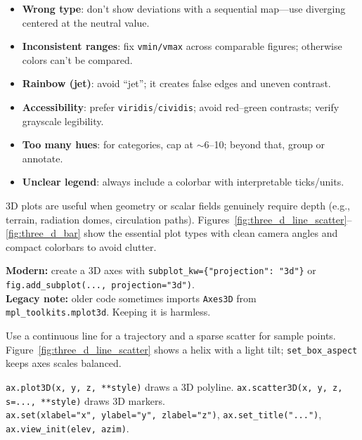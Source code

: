 
\begin{itemize}
    \item \textbf{Wrong type}: don’t show deviations with a sequential map—use diverging centered at the neutral value.
    \item \textbf{Inconsistent ranges}: fix \texttt{vmin/vmax} across comparable figures; otherwise colors can’t be compared.
    \item \textbf{Rainbow (jet)}: avoid “jet”; it creates false edges and uneven contrast.
    \item \textbf{Accessibility}: prefer \texttt{viridis}/\texttt{cividis}; avoid red--green contrasts; verify grayscale legibility.
    \item \textbf{Too many hues}: for categories, cap at $\sim$6–10; beyond that, group or annotate.
    \item \textbf{Unclear legend}: always include a colorbar with interpretable ticks/units.
\end{itemize}



3D plots are useful when geometry or scalar fields genuinely require depth (e.g., terrain, radiation domes, circulation paths). Figures~\ref{fig:three_d_line_scatter}–\ref{fig:three_d_bar} show the essential plot types with clean camera angles and compact colorbars to avoid clutter.

\begin{tcolorbox}[title=Getting a 3D axes (modern and legacy), colframe=blue, colback=white, arc=2mm, breakable]
\textbf{Modern:} create a 3D axes with \verb|subplot_kw={"projection": "3d"}| or \verb|fig.add_subplot(..., projection="3d")|.\\
\textbf{Legacy note:} older code sometimes imports \verb|Axes3D| from \verb|mpl_toolkits.mplot3d|. Keeping it is harmless.
\end{tcolorbox}


Use a continuous line for a trajectory and a sparse scatter for sample points. Figure~\ref{fig:three_d_line_scatter} shows a helix with a light tilt; \verb|set_box_aspect| keeps axes scales balanced.

\begin{tcolorbox}[title=Key syntax, colframe=blue, colback=white, arc=2mm, breakable]
\verb|ax.plot3D(x, y, z, **style)|  draws a 3D polyline. \quad
\verb|ax.scatter3D(x, y, z, s=..., **style)|  draws 3D markers.\\
\verb|ax.set(xlabel="x", ylabel="y", zlabel="z")|,\; \verb|ax.set_title("...")|,\; \verb|ax.view_init(elev, azim)|.
\end{tcolorbox}

